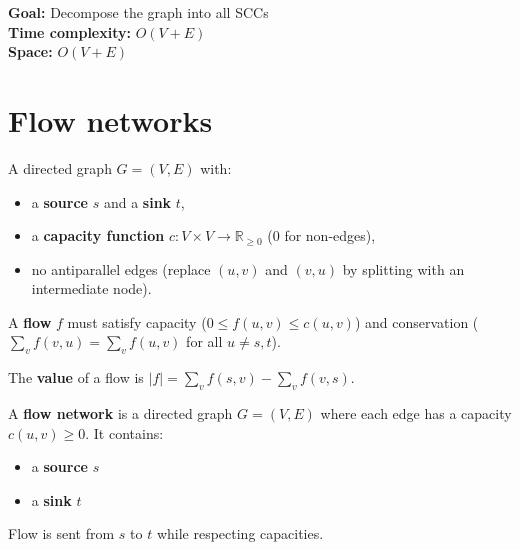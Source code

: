 \documentclass[11pt,a4paper,openany]{book}
\begin{document}
\textbf{Goal:} Decompose the graph into all SCCs \\

\textbf{Time complexity:} $O(V + E)$ \\

\textbf{Space:} $O(V + E)$








\vspace{2cm}















\chapter{Flow networks}




\begin{defnbox}[title=Flow network]
A directed graph $G = (V, E)$ with:
\begin{itemize}
  \item a \textbf{source} $s$ and a \textbf{sink} $t$,
  \item a \textbf{capacity function} $c : V \times V \to \mathbb{R}_{\geq 0}$ (0 for non-edges),
  \item no antiparallel edges (replace $(u,v)$ and $(v,u)$ by splitting with an intermediate node).
\end{itemize}
A \textbf{flow} $f$ must satisfy capacity ($0 \leq f(u,v) \leq c(u,v)$) and conservation
($\sum_v f(v,u) = \sum_v f(u,v)$ for all $u \neq s, t$).
\end{defnbox}

The \textbf{value} of a flow is $|f| = \sum_v f(s,v) - \sum_v f(v,s)$.




\begin{defnbox}[title=Flow Network]
A \textbf{flow network} is a directed graph $G = (V, E)$ where each edge has a capacity $c(u,v) \ge 0$.  
It contains:
\begin{itemize}
    \item a \textbf{source} $s$
    \item a \textbf{sink} $t$
\end{itemize}
Flow is sent from $s$ to $t$ while respecting capacities.
\end{defnbox}
\end{document}
